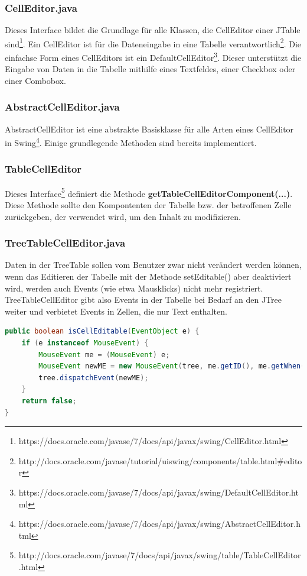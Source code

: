 \subsubsection*{CellEditor.java}
Dieses Interface bildet die Grundlage für alle Klassen, die CellEditor einer JTable sind\footnote{https://docs.oracle.com/javase/7/docs/api/javax/swing/CellEditor.html}.
Ein CellEditor ist für die Dateneingabe in eine Tabelle verantwortlich\footnote{http://docs.oracle.com/javase/tutorial/uiswing/components/table.html\#editor}. Die einfachse Form eines CellEditors ist ein DefaultCellEditor\footnote{https://docs.oracle.com/javase/7/docs/api/javax/swing/DefaultCellEditor.html}. Dieser unterstützt die Eingabe von Daten in die Tabelle mithilfe eines Textfeldes, einer Checkbox oder einer Combobox.

\subsubsection*{AbstractCellEditor.java}
AbstractCellEditor ist eine abstrakte Basisklasse für alle Arten eines CellEditor in Swing\footnote{https://docs.oracle.com/javase/7/docs/api/javax/swing/AbstractCellEditor.html}. Einige grundlegende Methoden sind bereits implementiert.

\subsubsection*{TableCellEditor}
Dieses Interface\footnote{http://docs.oracle.com/javase/7/docs/api/javax/swing/table/TableCellEditor.html} definiert die Methode \textbf{getTableCellEditorComponent(...)}. Diese Methode sollte den Kompontenten der Tabelle bzw. der betroffenen Zelle zurückgeben, der verwendet wird, um den Inhalt zu modifizieren.

\subsubsection*{TreeTableCellEditor.java}
Daten in der TreeTable sollen vom Benutzer zwar nicht verändert werden können, wenn das Editieren der Tabelle mit der Methode \glqq{}setEditable()\grqq{} aber deaktiviert wird, werden auch Events (wie etwa Mausklicks) nicht mehr registriert. TreeTableCellEditor gibt also Events in der Tabelle bei Bedarf an den JTree weiter und verbietet Events in Zellen, die nur Text enthalten.
\begin{lstlisting}[language=JAVA]
public boolean isCellEditable(EventObject e) {
	if (e instanceof MouseEvent) {
     	MouseEvent me = (MouseEvent) e;
    	MouseEvent newME = new MouseEvent(tree, me.getID(), me.getWhen(), me.getModifiers(), me.getX() - table.getCellRect(0, 0, true).x, me.getY(), 2, me.isPopupTrigger());
    	tree.dispatchEvent(newME);
  	}
  	return false;
}
\end{lstlisting}

